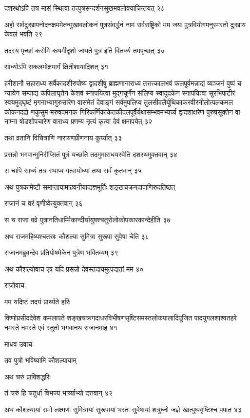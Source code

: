 दशरथोऽपि तत्र मासं स्थित्वा तत्पुत्रसन्दर्शनसुखमवलोक्याचिन्तयत् २८

अहो सर्वदुःखापनोदनक्षममेतन्मुखावलोकनं पुत्रसंवर्द्धनं नाम सर्वराष्ट्रिको मम जयः
पुत्रवियोगमनुस्मरतो दुःखाय केवलं भवति २९

तदस्य पृच्छां करोमि कथमीदृशो जायते पुत्र इति वितर्क्य तमपृच्छत् ३०

साध्योऽपि सकलमोक्षमार्गं क्षितीशायादिशत् ३१

हरीशानौ सहाराध्य सर्वैकादशीरुपोष्य द्वादशीषु ब्राह्मणानाराध्य तत्तत्कालभवं
फलपूर्वमन्नाद्यं व्यञ्जनं पुष्पं च न्यायेन सम्पाद्य कपिलाघृतेन केशवं स्नापयित्वा मुद्गचूर्णेन संलिप्य
स्वादूदकेन स्नापयित्वा सुरभिपाटीरं स्वयमुद्घृष्टं मृगनाभ्यागुरुसारेण वासमेतं देवाङ्गं सर्वमुपलिप्य
तुलसीदलैर्यूथिकाकरवीरनीलोत्पलकमल कोकनदद्रो णकुसुम मरुवदमनक
गिरिकर्णिकाकेतकीदलपूर्वैर्यथासम्भवमभ्यर्च्य द्वादशाक्षरेण पुरुषसूक्तेन वा नाम्ना षोडशोपचारेण
वाराध्य प्रणम्य नृत्यं कृत्वा देवं क्षमापयेत् ३२

तथा व्रतानि विचित्राणि नारायणप्रीणनाय कुर्य्यात् ३३

प्रसन्नो भगवान्मुनिरीप्सितं पुत्रं यच्छति तदमुमाराधयस्वेति दशरथमुक्तवान् ३४

स चापि साध्यं तत्र स्थाप्य गत्वायोध्यां तथा सर्वं कृतवान् ३५

अथ पुत्रकामेष्टौ समाप्तायामाहवनीयाद्यज्ञमूर्तिः शङ्खचक्रगदापाणिरुदतिष्ठत्

राजानं च वरं वृणीष्वेत्युक्तवान् ३६

स च राजा वव्रे पुत्रानतिधार्म्मिकान्दीर्घायुषश्चतुरोलोकोपकारकान्देहीति ३७

अथ राजमहिष्यश्चतस्रः कौशल्या सुमित्रा सुरूपा सुवेषा चेति ३८

राजानमब्रुवन्देव प्रतियोषमेकेन पुत्रेण भवितव्यम् ३९

अथ कौशल्योवाच एष यदि प्रसन्नो देवस्तदायमुत्पद्यतां मम ४०

राजोवाच-

मम यदिष्टं तदयं प्रार्थ्यते हरिः

विष्णोप्रसीददेवेश कमलापते शङ्खचक्रगदाधरविभीषणसृष्टिसमस्तलोकपालादिपूजित पादयुगलशाश्वतहरे
नमस्ते नमस्ते एवं स्तुतो भगवानथ राजानमाह ४१

माधव उवाच-

तव पुत्रो भविष्यामि कौशल्यायाम्

अथ चरुं प्राविशद्धरिः

तं चरुं हि चतुर्धा विभज्य भार्य्याभ्यो दत्तवान् ४२

अथ कौशल्यायां रामो लक्ष्मणः सुमित्रायां सुरूपायां भरतः सुवेषायां शत्रुघ्नो जज्ञे
खात्पुष्पवृष्टिश्च पपात ४३

